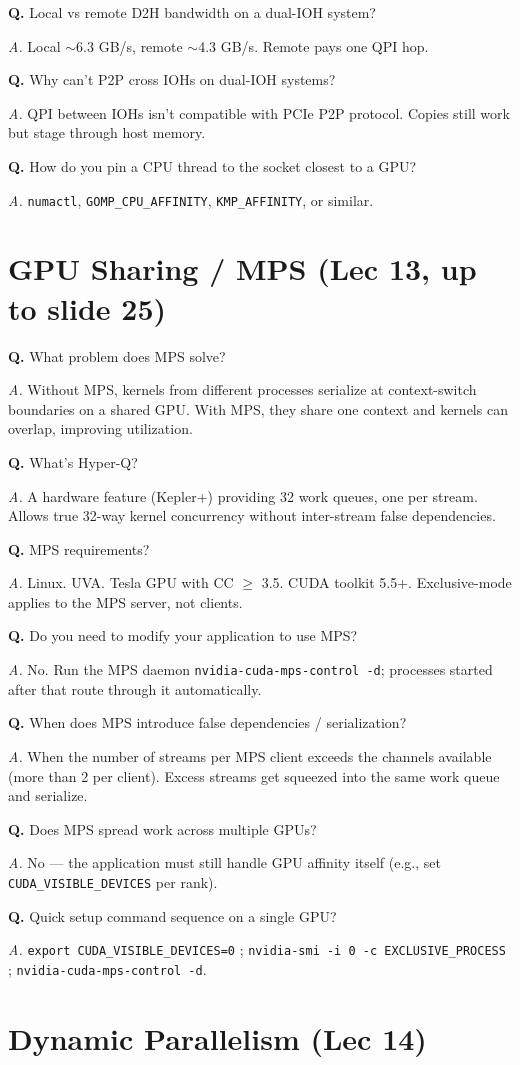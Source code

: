 \documentclass[10pt]{article}
\newcommand{\q}[1]{\par\vspace{6pt}\noindent\textbf{Q.} #1}
\newcommand{\ans}[1]{\par\noindent\textit{A.} #1\par}
\begin{document}
\q{Local vs remote D2H bandwidth on a dual-IOH system?}
\ans{Local $\sim$6.3 GB/s, remote $\sim$4.3 GB/s. Remote pays one QPI hop.}

\q{Why can't P2P cross IOHs on dual-IOH systems?}
\ans{QPI between IOHs isn't compatible with PCIe P2P protocol. Copies still work but stage through host memory.}

\q{How do you pin a CPU thread to the socket closest to a GPU?}
\ans{\texttt{numactl}, \texttt{GOMP\_CPU\_AFFINITY}, \texttt{KMP\_AFFINITY}, or similar.}

\hrulefill

\section*{GPU Sharing / MPS (Lec 13, up to slide 25)}

\q{What problem does MPS solve?}
\ans{Without MPS, kernels from different processes serialize at context-switch boundaries on a shared GPU. With MPS, they share one context and kernels can overlap, improving utilization.}

\q{What's Hyper-Q?}
\ans{A hardware feature (Kepler+) providing 32 work queues, one per stream. Allows true 32-way kernel concurrency without inter-stream false dependencies.}

\q{MPS requirements?}
\ans{Linux. UVA. Tesla GPU with CC $\geq$ 3.5. CUDA toolkit 5.5+. Exclusive-mode applies to the MPS server, not clients.}

\q{Do you need to modify your application to use MPS?}
\ans{No. Run the MPS daemon \texttt{nvidia-cuda-mps-control -d}; processes started after that route through it automatically.}

\q{When does MPS introduce false dependencies / serialization?}
\ans{When the number of streams per MPS client exceeds the channels available (more than 2 per client). Excess streams get squeezed into the same work queue and serialize.}

\q{Does MPS spread work across multiple GPUs?}
\ans{No — the application must still handle GPU affinity itself (e.g., set \texttt{CUDA\_VISIBLE\_DEVICES} per rank).}

\q{Quick setup command sequence on a single GPU?}
\ans{\texttt{export CUDA\_VISIBLE\_DEVICES=0} ; \texttt{nvidia-smi -i 0 -c EXCLUSIVE\_PROCESS} ; \texttt{nvidia-cuda-mps-control -d}.}

\hrulefill

\section*{Dynamic Parallelism (Lec 14)}
\end{document}
